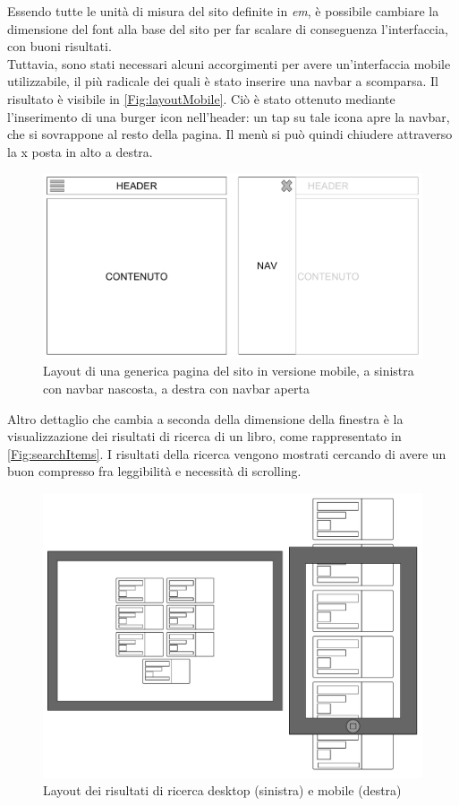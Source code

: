 Essendo tutte le unità di misura del sito definite in \textit{em}, è possibile cambiare la dimensione del font alla base del sito per far scalare di conseguenza l'interfaccia, con buoni risultati.\\
Tuttavia, sono stati necessari alcuni accorgimenti per avere un'interfaccia mobile utilizzabile, il più radicale dei quali è stato inserire una navbar a scomparsa. Il risultato è visibile in \autoref{Fig:layoutMobile}. Ciò è stato ottenuto mediante l'inserimento di una burger icon nell'header: un tap su tale icona apre la navbar, che si sovrappone al resto della pagina. Il menù si può quindi chiudere attraverso la x posta in alto a destra.\\

\begin{figure}
	\includegraphics[width=1\linewidth]{sez/Progettazione/Layout/layout-mobile.pdf}
	\caption{Layout di una generica pagina del sito in versione mobile, a sinistra con navbar nascosta, a destra con navbar aperta}
	\label{Fig:layoutMobile}
\end{figure}

Altro dettaglio che cambia a seconda della dimensione della finestra è la visualizzazione dei risultati di ricerca di un libro, come rappresentato in \autoref{Fig:searchItems}. I risultati della ricerca vengono mostrati cercando di avere un buon compresso fra leggibilità e necessità di scrolling.

\begin{figure}
	\includegraphics[width=1\linewidth]{sez/Progettazione/Layout/Search-items.pdf}
	\caption{Layout dei risultati di ricerca desktop (sinistra) e mobile (destra)}
	\label{Fig:searchItems}
\end{figure}